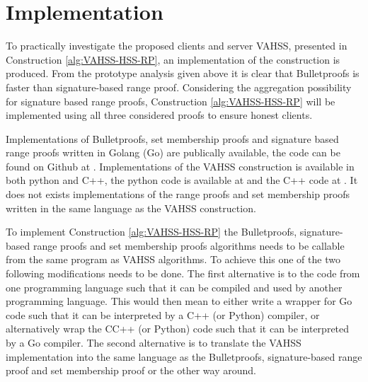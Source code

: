 \section{Implementation}
\label{sec:implementation}
To practically investigate the proposed clients and server VAHSS, presented in Construction \ref{alg:VAHSS-HSS-RP}, an implementation of the construction is produced. %
 From the prototype analysis given above it is clear that Bulletproofs is faster than signature-based range proof. Considering the aggregation possibility for signature based range proofs, Construction \ref{alg:VAHSS-HSS-RP} will be implemented using all three considered proofs to ensure honest clients. 
 

Implementations of Bulletproofs, set membership proofs and signature based range proofs written in Golang (Go) are publically available, the code can be found on Github at \cite{Git:RP}. Implementations of the VAHSS construction is available in both python and C++, the python code is available at  \cite{Git:python_vahss} and the C++ code at \cite{Git:C_vahss}. It does not exists implementations of the range proofs and set membership proofs  written in the same language as the  VAHSS construction. 

To implement Construction \ref{alg:VAHSS-HSS-RP} the Bulletproofs, signature-based range proofs and set membership proofs algorithms needs to be callable from the same program as VAHSS algorithms. To achieve this one of the two following modifications needs to be done. The first alternative is to  the code from one programming language such that it can be compiled and used by another programming language. This would then mean to either write a wrapper for Go code such that it can be interpreted by a C++ (or Python) compiler, or alternatively wrap the  CC++ (or Python) code such that it can be interpreted by a Go compiler. The second alternative is to translate the VAHSS implementation into the same language as the Bulletproofs, signature-based range proof and set membership proof or the other way around. 

